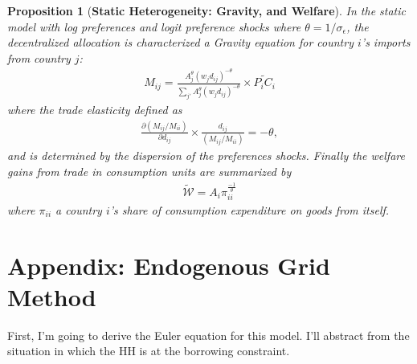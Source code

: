\documentclass[12pt,pdftex]{article}
\newtheorem{prp}{Proposition}
\begin{document}
\begin{onehalfspacing}
\begin{prp}[\textbf{Static Heterogeneity: Gravity, and Welfare}] \label{apx-prp:static} In the static model with log preferences and logit preference shocks where $\theta = 1 / \sigma_{\epsilon}$, the decentralized allocation is characterized a Gravity equation for country $i$'s imports from country $j$:
{\small
\begin{align}
M_{ij} =  \frac{A_j^{\theta}(w_jd_{ij})^{-\theta}}{\sum_{j'} A_j^{\theta}(w_jd_{ij})^{-\theta}} \times \widetilde{P_{i} C_{i}}
\label{appendix-eq:static-gravity}
\end{align}
}
where the trade elasticity defined as 
\begin{align}
\frac{\partial ( M_{ij} / M_{ii} )}{\partial d_{ij}} \times \frac{d_{ij}}{( M_{ij} / M_{ii} )} = -\theta,
\end{align}
and is determined by the dispersion of the preferences shocks. Finally the welfare gains from trade in consumption units are summarized by
\begin{align}
\mathcal{\tilde W} = A_{i} \pi_{ii}^{\frac{-1}{\theta}}
\end{align}
where $\pi_{ii}$ a country $i$'s share of consumption expenditure on goods from itself.
\end{prp}


\section{Appendix: Endogenous Grid Method}

First, I'm going to derive the Euler equation for this model. I'll abstract from the situation in which the HH is at the borrowing constraint.


\end{onehalfspacing}
\end{document}
